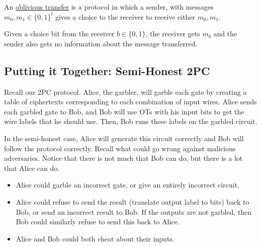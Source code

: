 \begin{definition}
    An \ul{oblivious transfer} is a protocol in which a sender, with messages $m_0, m_1\in\{0, 1\}^l$ gives a choice to the receiver to receive either $m_0, m_1$.

    Given a choice bit from the receiver $b\in\{0,1\}$, the receiver gets $m_b$ and the sender also gets no information about the message transferred.


\end{definition}

\subsection{Putting it Together: Semi-Honest 2PC}\label{sec:mar23-semihonest-2pc-together}

Recall our 2PC protocol. Alice, the garbler, will garble each gate by creating a table of ciphertexts corresponding to each combination of input wires. Alice sends each garbled gate to Bob, and Bob will use OTs with his input bits to get the wire labels that he should use. Then, Bob runs these labels on the garbled circuit.


In the semi-honest case, Alice will generate this circuit correctly and Bob will follow the protocol correctly. Recall what could go wrong against malicious adversaries. Notice that there is not much that Bob can do, but there is a lot that Alice can do.
\begin{itemize}
    \item Alice could garble an incorrect gate, or give an entirely incorrect circuit.
    \item Alice could refuse to send the result (translate output label to bits) back to Bob, or send an incorrect result to Bob. If the outputs are not garbled, then Bob could similarly refuse to send this back to Alice.
    \item Alice and Bob could both cheat about their inputs.
\end{itemize}

